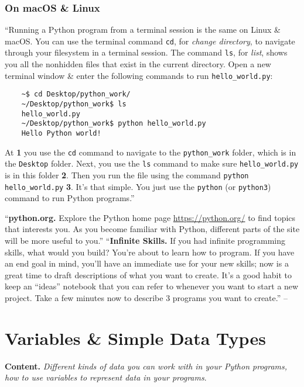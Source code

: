 \documentclass[oneside]{book}
\numberwithin{equation}{section}
\begin{document}
\subsubsection{On macOS \& Linux}
``Running a Python program from a terminal session is the same on Linux \& macOS. You can use the terminal command \texttt{cd}, for \textit{change directory}, to navigate through your filesystem in a terminal session. The command \texttt{ls}, for \textit{list}, shows you all the nonhidden files that exist in the current directory. Open a new terminal window \& enter the following commands to run \verb|hello_world.py|:
\begin{verbatim}
	~$ cd Desktop/python_work/
	~/Desktop/python_work$ ls
	hello_world.py
	~/Desktop/python_work$ python hello_world.py
	Hello Python world!
\end{verbatim}
At \textbf{1} you use the \texttt{cd} command to navigate to the \verb|python_work| folder, which is in the \texttt{Desktop} folder. Next, you use the \texttt{ls} command to make sure \verb|hello_world.py| is in this folder \textbf{2}. Then you run the file using the command \verb|python hello_world.py| \textbf{3}. It's that simple. You just use the \texttt{python} (or \texttt{python3}) command to run Python programs.''

``\textbf{python.org.} Explore the Python home page \url{https://python.org/} to find topics that interests you. As you become familiar with Python, different parts of the site will be more useful to you.'' ``\textbf{Infinite Skills.} If you had infinite programming skills, what would you build? You're about to learn how to program. If you have an end goal in mind, you'll have an immediate use for your new skills; now is a great time to draft descriptions of what you want to create. It's a good habit to keep an ``ideas'' notebook that you can refer to whenever you want to start a new project. Take a few minutes now to describe 3 programs you want to create.'' -- \cite[pp. 12--13]{Matthes2019}


\section{Variables \& Simple Data Types}
\textbf{Content.} \textit{Different kinds of data you can work with in your Python programs, how to use variables to represent data in your programs}.
\end{document}
